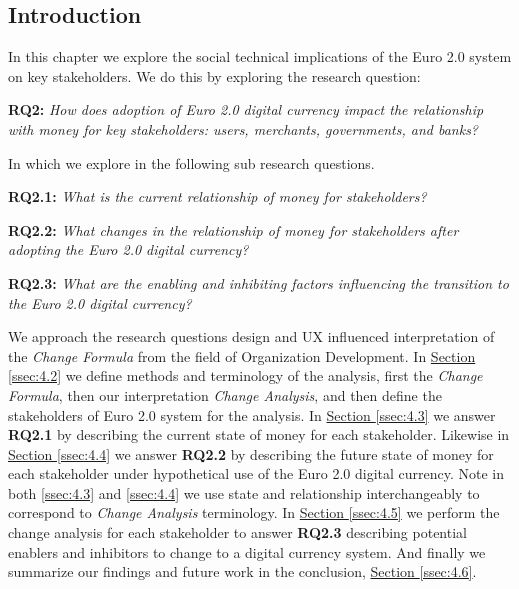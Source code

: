 \documentclass[a4paper,12pt]{article} %
\newcommand{\hypersectionref}[1]{\hyperref[#1]{Section \ref{#1}}}
\begin{document}
{\subsection{Introduction} \label{ssec:4.1}

In this chapter we explore the social technical implications of the Euro 2.0 system on key stakeholders. We do this by exploring the research question:

\begin{quoting}
	\textbf{RQ2:} \textit{How does adoption of Euro 2.0 digital currency impact the relationship with money for key stakeholders: users, merchants, governments, and banks?}
\end{quoting}

In which we explore in the following sub research questions.

\begin{quoting}
	\textbf{RQ2.1:} \textit{What is the current relationship of money for stakeholders?}
\end{quoting}
\begin{quoting}
	\textbf{RQ2.2:} \textit{What changes in the relationship of money for stakeholders after adopting the Euro 2.0 digital currency?}
\end{quoting}
\begin{quoting}
	\textbf{RQ2.3:} \textit{What are the enabling and inhibiting factors influencing the transition to the Euro 2.0 digital currency?}
\end{quoting}

We approach the research questions design and UX influenced interpretation of the \textit{Change Formula} from the field of Organization Development\cite{dannemiller1992}. In \hypersectionref{ssec:4.2} we define methods and terminology of the analysis, first the \textit{Change Formula}, then our interpretation \textit{Change Analysis}, and then define the stakeholders of Euro 2.0 system for the analysis. In \hypersectionref{ssec:4.3} we answer \textbf{RQ2.1} by describing the current state of money for each stakeholder. Likewise in \hypersectionref{ssec:4.4} we answer \textbf{RQ2.2} by describing the future state of money for each stakeholder under hypothetical use of the Euro 2.0 digital currency. Note in both \ref{ssec:4.3} and \ref{ssec:4.4} we use state and relationship interchangeably to correspond to \textit{Change Analysis} terminology. In \hypersectionref{ssec:4.5} we perform the change analysis for each stakeholder to answer \textbf{RQ2.3} describing potential enablers and inhibitors to change to a digital currency system. And finally we summarize our findings and future work in the conclusion, \hypersectionref{ssec:4.6}.

}
\end{document}
